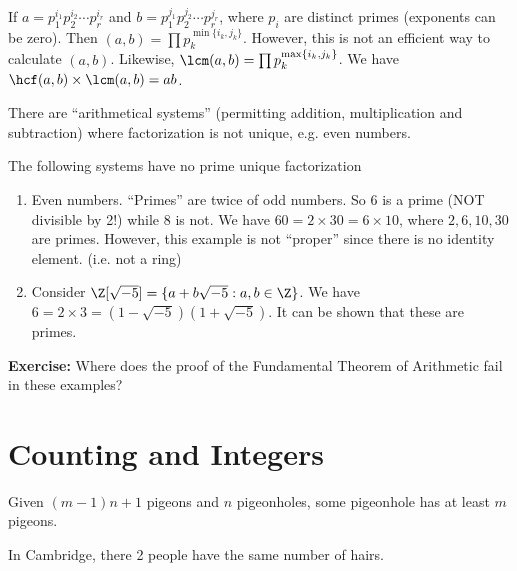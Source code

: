 \documentclass[a4paper]{article}
\begin{document}
  \begin{cor}
    If $a = p_1^{i_1}p_2^{i_2}\cdots p_r^{i_r}$ and $b = p_1^{j_1}p_2^{j_2}\cdots p_r^{j_r}$, where $p_i$ are distinct primes (exponents can be zero). Then $(a, b)=\prod p_k^{\min\{i_k, j_k\}}$. However, this is not an efficient way to calculate $(a, b)$. Likewise, $\lcm(a, b) = \prod p_k^{\max\{i_k, j_k\}}$. We have $\hcf(a, b)\times\lcm(a, b) = ab$. 
  \end{cor}


  \note There are ``arithmetical systems'' (permitting addition, multiplication and subtraction) where factorization is not unique, e.g. even numbers.

  \begin{eg}
    The following systems have no prime unique factorization
    \begin{enumerate}
      \item Even numbers. ``Primes'' are twice of odd numbers. So 6 is a prime (NOT divisible by 2!) while 8 is not. We have $60 = 2\times 30 = 6\times 10$, where $2, 6, 10, 30$ are primes. However, this example is not ``proper'' since there is no identity element. (i.e. not a ring)
      \item Consider $\Z[\sqrt{-5}] = \{a + b\sqrt{-5} : a, b\in \Z\}$. We have $6 = 2\times 3 = (1 - \sqrt{-5})(1 + \sqrt{-5})$. It can be shown that these are primes.
    \end{enumerate}
  \end{eg}
  \noindent\textbf{Exercise:} Where does the proof of the Fundamental Theorem of Arithmetic fail in these examples?

  \section{Counting and Integers}
  \begin{thm}
    Given $(m - 1)n + 1$ pigeons and $n$ pigeonholes, some pigeonhole has at least $m$ pigeons.
  \end{thm}

  \begin{eg}
    In Cambridge, there 2 people have the same number of hairs.
  \end{eg}
\end{document}

